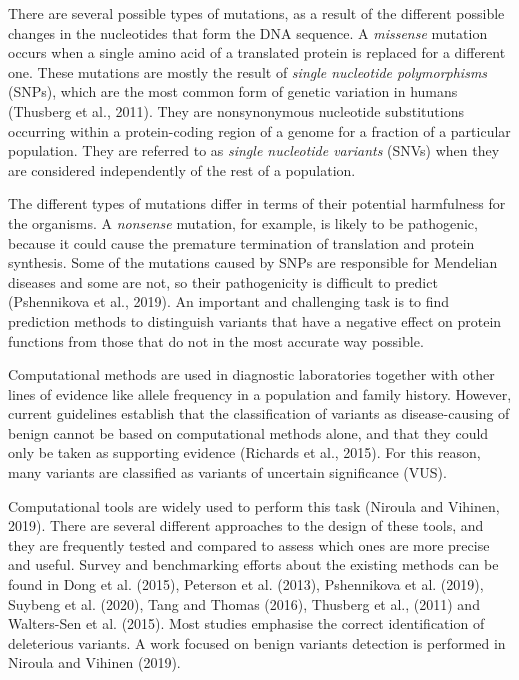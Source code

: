 \documentclass[12pt,MSc,wordcount,anon]{muthesis}
\begin{document}
\begin{flushleft}
There are several possible types of mutations, as a result of the different possible changes in the nucleotides that form the DNA sequence. A \textit{missense} mutation occurs when a single amino acid of a translated protein is replaced for a different one. These mutations are mostly the result of \textit{single nucleotide polymorphisms} (SNPs), which are the most common form of genetic variation in humans (Thusberg et al., 2011). They are nonsynonymous nucleotide substitutions occurring within a protein-coding region of a genome for a fraction of a particular population. They are referred to as \textit{single nucleotide variants} (SNVs) when they are considered independently of the rest of a population.

The different types of mutations differ in terms of their potential harmfulness for the organisms. A \textit{nonsense} mutation, for example, is likely to be pathogenic, because it could cause the premature termination of translation and protein synthesis. Some of the mutations caused by SNPs are responsible for Mendelian diseases and some are not, so their pathogenicity is difficult to predict (Pshennikova et al., 2019). An important and challenging task is to find prediction methods to distinguish variants that have a negative effect on protein functions from those that do not in the most accurate way possible.

Computational methods are used in diagnostic laboratories together with other lines of evidence like allele frequency in a population and family history. However, current guidelines establish that the classification of variants as disease-causing of benign cannot be based on computational methods alone, and that they could only be taken as supporting evidence (Richards et al., 2015). For this reason, many variants are classified as variants of uncertain significance (VUS).

Computational tools are widely used to perform this task (Niroula and Vihinen, 2019). There are several different approaches to the design of these tools, and they are frequently tested and compared to assess which ones are more precise and useful. Survey and benchmarking efforts about the existing methods can be found in Dong et al. (2015), Peterson et al. (2013), Pshennikova et al. (2019), Suybeng et al. (2020), Tang and Thomas (2016), Thusberg et al., (2011) and Walters-Sen et al. (2015). Most studies emphasise the correct identification of deleterious variants. A work focused on benign variants detection is performed in Niroula and Vihinen (2019).


\end{flushleft}
\end{document}
